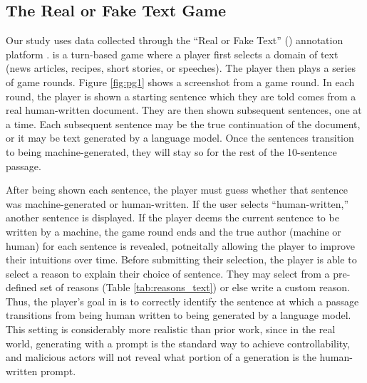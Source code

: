 
\subsection{The Real or Fake Text Game}
Our study uses data collected through the ``Real or Fake Text'' (\ROFT{}) annotation platform \citep{dugan2020roft}.
\ROFT{} is a turn-based game where a player first selects a domain of text (news articles, recipes, short stories, or speeches).
The player then plays a series of game rounds.
Figure \ref{fig:pg1} shows a screenshot from a game round.
In each round, the player is shown a starting sentence which they are told comes from a real human-written document.
They are then shown subsequent sentences, one at a time.
Each subsequent sentence may be the true continuation of the document, or it may be text generated by a language model.
Once the sentences transition to being machine-generated, they will stay so for the rest of the 10-sentence passage.

After being shown each sentence, the player must guess whether that sentence was machine-generated or human-written.
If the user selects ``human-written,'' another sentence is displayed.
If the player deems the current sentence to be written by a machine, the game round ends and the true author (machine or human) for each sentence is revealed, potneitally allowing the player to improve their intuitions over time.
Before submitting their selection, the player is able to select a reason to explain their choice of sentence.
They may select from a pre-defined set of reasons (Table \ref{tab:reasons_text}) or else write a custom reason.
Thus, the player's goal in \ROFT{} is to correctly identify the sentence at which a passage transitions from being human written to being generated by a language model.
This setting is considerably more realistic than prior work, since in the real world, generating with a prompt is the standard way to achieve controllability, and malicious actors will not reveal what portion of a generation is the human-written prompt.

